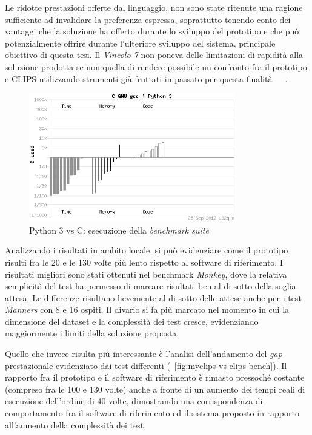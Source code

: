 Le ridotte prestazioni offerte dal linguaggio, non sono state ritenute una ragione sufficiente ad invalidare la preferenza espressa, soprattutto tenendo conto dei vantaggi che la soluzione ha offerto durante lo sviluppo del prototipo e che può potenzialmente offrire durante l'ulteriore sviluppo del sistema, principale obiettivo di questa tesi. Il \emph{Vincolo-7} non poneva delle limitazioni di rapidità alla soluzione prodotta se non quella di rendere possibile un confronto fra il prototipo e CLIPS utilizzando strumenti già fruttati in passato per questa finalità~\cite{rbsbench}~\cite{ops5bench}~\cite{brantetal91}.


\begin{figure}
\centering
\includegraphics[width=0.8\textwidth]{Immagini/Capitolo3/c-vs-python.png}
\caption{Python 3 vs C: esecuzione della \emph{benchmark suite}~\cite{cpybench}  }\label{fig:c-vs-python-bench}
\end{figure}

Analizzando i risultati in ambito locale, si può evidenziare come il prototipo risulti fra le 20 e le 130 volte più lento rispetto al software di riferimento. I risultati migliori sono stati ottenuti nel benchmark \emph{Monkey}, dove la relativa semplicità del test ha permesso di marcare risultati ben al di sotto della soglia attesa. Le differenze risultano lievemente al di sotto delle attese anche per i test \emph{Manners} con 8 e 16 ospiti. Il divario si fa più marcato nel momento in cui la dimensione del dataset e la complessità dei test cresce, evidenziando maggiormente i limiti della soluzione proposta.

Quello che invece risulta più interessante è l'analisi dell'andamento del \emph{gap} prestazionale evidenziato dai test differenti (\figurename~\ref{fig:myclips-vs-clips-bench}). Il rapporto fra il prototipo e il software di riferimento è rimasto pressoché costante (compreso fra le 100 e 130 volte) anche a fronte di un aumento dei tempi reali di esecuzione dell'ordine di 40 volte, dimostrando una corrispondenza di comportamento fra il software di riferimento ed il sistema proposto in rapporto all'aumento della complessità dei test.


